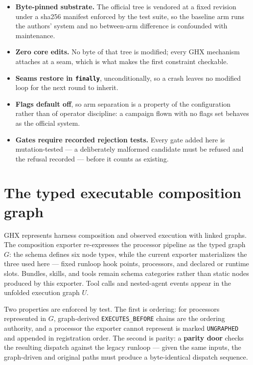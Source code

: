 \begin{itemize}
  \item \textbf{Byte-pinned substrate.} The official tree is vendored at a
        fixed revision under a sha256 manifest enforced by the test suite,
        so the baseline arm runs the authors' system and no between-arm
        difference is confounded with maintenance.
  \item \textbf{Zero core edits.} No byte of that tree is modified; every
        GHX mechanism attaches at a seam, which is what makes the first
        constraint checkable.
  \item \textbf{Seams restore in \texttt{finally}}, unconditionally, so a
        crash leaves no modified loop for the next round to inherit.
  \item \textbf{Flags default off}, so arm separation is a property of the
        configuration rather than of operator discipline: a campaign flown
        with no flags set behaves as the official system.
  \item \textbf{Gates require recorded rejection tests.} Every gate
        added here is mutation-tested --- a deliberately malformed
        candidate must be refused and the refusal recorded --- before it
        counts as existing.
\end{itemize}

\section{The typed executable composition graph}
\label{sec:composition-graph}

GHX represents harness composition and observed execution with linked
graphs. The composition exporter re-expresses the processor pipeline as
the typed graph $G$: the schema defines six node types, while the current
exporter materializes the three used here --- fixed runloop hook points,
processors, and declared or runtime slots. Bundles, skills, and tools remain
schema categories rather than static nodes produced by this exporter. Tool
calls and nested-agent events appear in the unfolded execution graph $U$.

Two properties are enforced by test. The first is ordering: for processors
represented in $G$, graph-derived \texttt{EXECUTES\_BEFORE} chains are the
ordering authority, and a processor the exporter cannot represent is marked
\texttt{UNGRAPHED} and appended in registration order. The second is parity:
a \textbf{parity door} checks the resulting dispatch against the legacy
runloop --- given the same inputs, the graph-driven and original paths must
produce a byte-identical dispatch sequence.

